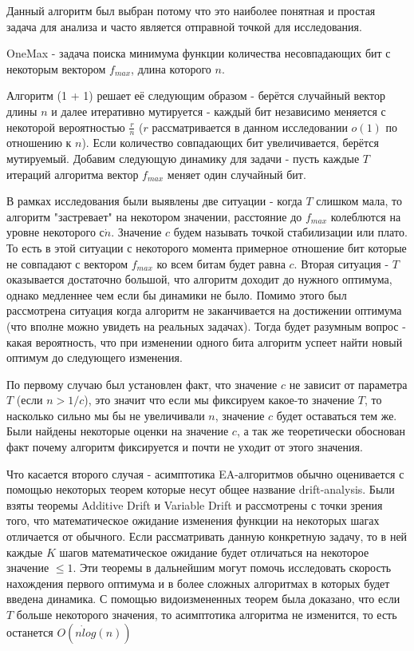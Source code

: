 \documentclass[times,specification,annotation]{itmo-student-thesis}
\begin{document}
    Данный алгоритм был выбран потому что это наиболее понятная и простая задача для анализа и часто является отправной точкой для исследования.

    OneMax - задача поиска минимума функции количества несовпадающих бит с некоторым вектором $f_{max}$, длина которого $n$.

    Алгоритм (1 + 1) решает её следующим образом - берётся случайный вектор длины $n$ и далее итеративно мутируется - каждый бит независимо меняется с некоторой вероятностью $\frac{r}{n}$ ($r$ рассматривается в данном исследовании $o(1)$ по отношению к $n$).
    Если количество совпадающих бит увеличивается, берётся мутируемый.
    Добавим следующую динамику для задачи - пусть каждые $T$ итераций алгоритма вектор $f_{max}$ меняет один случайный бит.

    В рамках исследования были выявлены две ситуации - когда $T$ слишком мала, то алгоритм "застревает"  на некотором значении, расстояние до $f_{max}$ колеблются на уровне некоторого $с \dot n$.
    Значение $c$ будем называть точкой стабилизации или плато.
    То есть в этой ситуации с некоторого момента примерное отношение бит которые не совпадают с вектором $f_{max}$ ко всем битам будет равна $c$.
    Вторая ситуация - $T$ оказывается достаточно большой, что алгоритм доходит до нужного оптимума, однако медленнее чем если бы динамики не было.
    Помимо этого был рассмотрена ситуация когда алгоритм не заканчивается на достижении оптимума (что вполне можно увидеть на реальных задачах).
    Тогда будет разумным вопрос - какая вероятность, что при изменении одного бита алгоритм успеет найти новый оптимум до следующего изменения.

    По первому случаю был установлен факт, что значение $c$ не зависит от параметра $T$ (если $n > 1/c$), это значит что если мы фиксируем какое-то значение $T$, то насколько сильно мы бы не увеличивали $n$, значение $c$ будет оставаться тем же.
    Были найдены некоторые оценки на значение $c$, а так же теоретически обоснован факт почему алгоритм фиксируется и почти не уходит от этого значения.

    Что касается второго случая - асимптотика EA-алгоритмов обычно оценивается с помощью некоторых теорем которые несут общее название drift-analysis.
    Были взяты теоремы Additive Drift и Variable Drift и рассмотрены с точки зрения того, что математическое ожидание изменения функции на некоторых шагах отличается от обычного.
    Если рассматривать данную конкретную задачу, то в ней каждые $K$ шагов математическое ожидание будет отличаться на некоторое значение $\leq 1$.
    Эти теоремы в дальнейшим могут помочь исследовать скорость нахождения первого оптимума и в более сложных алгоритмах в которых будет введена динамика.
    С помощью видоизмененных теорем была доказано, что если $T$ больше некоторого значения, то асимптотика алгоритма не изменится, то есть останется $O(n \dot log(n))$
\end{document}
